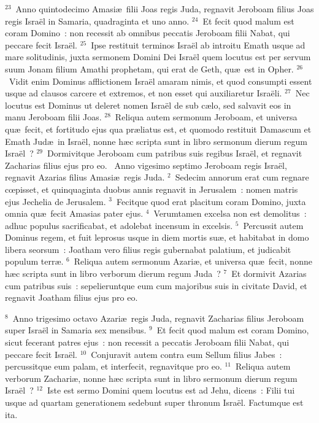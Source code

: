 ${}^{23}$~Anno quintodecimo Amasi\ae\ filii Joas regis Juda, regnavit Jeroboam filius Joas regis Isra\"el in Samaria, quadraginta et uno anno.
${}^{24}$~Et fecit quod malum est coram Domino~: non recessit ab omnibus peccatis Jeroboam filii Nabat, qui peccare fecit Isra\"el.
${}^{25}$~Ipse restituit terminos Isra\"el ab introitu Emath usque ad mare solitudinis, juxta sermonem Domini Dei Isra\"el quem locutus est per servum suum Jonam filium Amathi prophetam, qui erat de Geth, qu\ae\ est in Opher.
${}^{26}$~Vidit enim Dominus afflictionem Isra\"el amaram nimis, et quod consumpti essent usque ad clausos carcere et extremos, et non esset qui auxiliaretur Isra\"eli.
${}^{27}$~Nec locutus est Dominus ut deleret nomen Isra\"el de sub c\ae lo, sed salvavit eos in manu Jeroboam filii Joas.
${}^{28}$~Reliqua autem sermonum Jeroboam, et universa qu\ae\ fecit, et fortitudo ejus qua pr\ae liatus est, et quomodo restituit Damascum et Emath Jud\ae\ in Isra\"el, nonne h\ae c scripta sunt in libro sermonum dierum regum Isra\"el~?
${}^{29}$~Dormivitque Jeroboam cum patribus suis regibus Isra\"el, et regnavit Zacharias filius ejus pro eo.
~Anno vigesimo septimo Jeroboam regis Isra\"el, regnavit Azarias filius Amasi\ae\ regis Juda.
${}^{2}$~Sedecim annorum erat cum regnare cœpisset, et quinquaginta duobus annis regnavit in Jerusalem~: nomen matris ejus Jechelia de Jerusalem.
${}^{3}$~Fecitque quod erat placitum coram Domino, juxta omnia qu\ae\ fecit Amasias pater ejus.
${}^{4}$~Verumtamen excelsa non est demolitus~: adhuc populus sacrificabat, et adolebat incensum in excelsis.
${}^{5}$~Percussit autem Dominus regem, et fuit leprosus usque in diem mortis su\ae , et habitabat in domo libera seorsum~: Joatham vero filius regis gubernabat palatium, et judicabit populum terr\ae .
${}^{6}$~Reliqua autem sermonum Azari\ae , et universa qu\ae\ fecit, nonne h\ae c scripta sunt in libro verborum dierum regum Juda~?
${}^{7}$~Et dormivit Azarias cum patribus suis~: sepelieruntque eum cum majoribus suis in civitate David, et regnavit Joatham filius ejus pro eo.


${}^{8}$~Anno trigesimo octavo Azari\ae\ regis Juda, regnavit Zacharias filius Jeroboam super Isra\"el in Samaria sex mensibus.
${}^{9}$~Et fecit quod malum est coram Domino, sicut fecerant patres ejus~: non recessit a peccatis Jeroboam filii Nabat, qui peccare fecit Isra\"el.
${}^{10}$~Conjuravit autem contra eum Sellum filius Jabes~: percussitque eum palam, et interfecit, regnavitque pro eo.
${}^{11}$~Reliqua autem verborum Zachari\ae , nonne h\ae c scripta sunt in libro sermonum dierum regum Isra\"el~?
${}^{12}$~Iste est sermo Domini quem locutus est ad Jehu, dicens~: Filii tui usque ad quartam generationem sedebunt super thronum Isra\"el. Factumque est ita.



